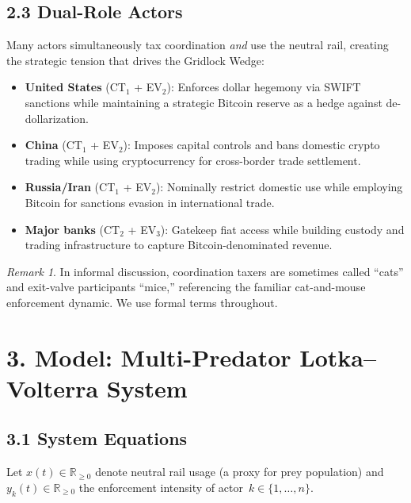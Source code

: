 \documentclass[12pt]{article}
\theoremstyle{definition}
\theoremstyle{remark}
\newtheorem*{remark}{Remark}
\begin{document}
\subsection{2.3 Dual-Role Actors}

Many actors simultaneously tax coordination \emph{and} use the neutral
rail, creating the strategic tension that drives the Gridlock Wedge:

\begin{itemize}
  \item \textbf{United States} (CT$_1$ + EV$_2$): Enforces dollar
    hegemony via SWIFT sanctions while maintaining a strategic Bitcoin
    reserve as a hedge against de-dollarization.
  \item \textbf{China} (CT$_1$ + EV$_2$): Imposes capital controls and
    bans domestic crypto trading while using cryptocurrency for
    cross-border trade settlement.
  \item \textbf{Russia/Iran} (CT$_1$ + EV$_2$): Nominally restrict
    domestic use while employing Bitcoin for sanctions evasion in
    international trade.
  \item \textbf{Major banks} (CT$_2$ + EV$_3$): Gatekeep fiat access
    while building custody and trading infrastructure to capture
    Bitcoin-denominated revenue.
\end{itemize}

\begin{remark}
In informal discussion, coordination taxers are sometimes called
``cats'' and exit-valve participants ``mice,'' referencing the familiar
cat-and-mouse enforcement dynamic. We use formal terms throughout.
\end{remark}

\section{3. Model: Multi-Predator Lotka--Volterra System}\label{sec:model}

\subsection{3.1 System Equations}

Let $x(t) \in \mathbb{R}_{\geq 0}$ denote neutral rail usage (a proxy
for prey population) and $y_k(t) \in \mathbb{R}_{\geq 0}$ the
enforcement intensity of actor~$k \in \{1, \ldots, n\}$.
\end{document}
